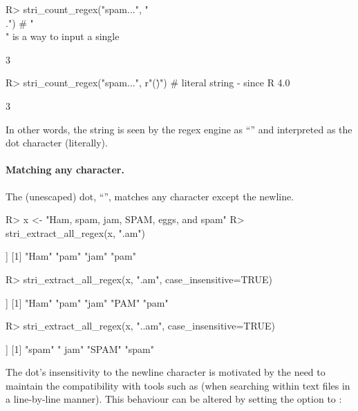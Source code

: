 \documentclass[nojss]{jss}\usepackage[]{graphicx}\usepackage[]{color}
\begin{document}
\begin{Schunk}
\begin{Sinput}
R> stri_count_regex("spam...", "\\.")   # "\\" is a way to input a single \
\end{Sinput}
\begin{Soutput}
[1] 3
\end{Soutput}
\begin{Sinput}
R> stri_count_regex("spam...", r"(\.)") # literal string - since R 4.0
\end{Sinput}
\begin{Soutput}
[1] 3
\end{Soutput}
\end{Schunk}

In other words, the  string 
is seen by the regex engine as ``\code{\textbackslash.}'' and interpreted
as the dot character (literally).


\paragraph{Matching any character.}
The (unescaped) dot, ``'', matches any character except the newline.

\begin{Schunk}
\begin{Sinput}
R> x <- "Ham, spam, jam, SPAM, eggs, and spam"
R> stri_extract_all_regex(x, ".am")
\end{Sinput}
\begin{Soutput}
[[1]]
[1] "Ham" "pam" "jam" "pam"
\end{Soutput}
\begin{Sinput}
R> stri_extract_all_regex(x, ".am", case_insensitive=TRUE)
\end{Sinput}
\begin{Soutput}
[[1]]
[1] "Ham" "pam" "jam" "PAM" "pam"
\end{Soutput}
\begin{Sinput}
R> stri_extract_all_regex(x, "..am", case_insensitive=TRUE)
\end{Sinput}
\begin{Soutput}
[[1]]
[1] "spam" " jam" "SPAM" "spam"
\end{Soutput}
\end{Schunk}



The dot's insensitivity to the newline character is motivated
by the need to maintain the compatibility with tools such as 
(when searching within text files in a line-by-line manner).
This behaviour can be altered by setting the  option to :
\end{document}
